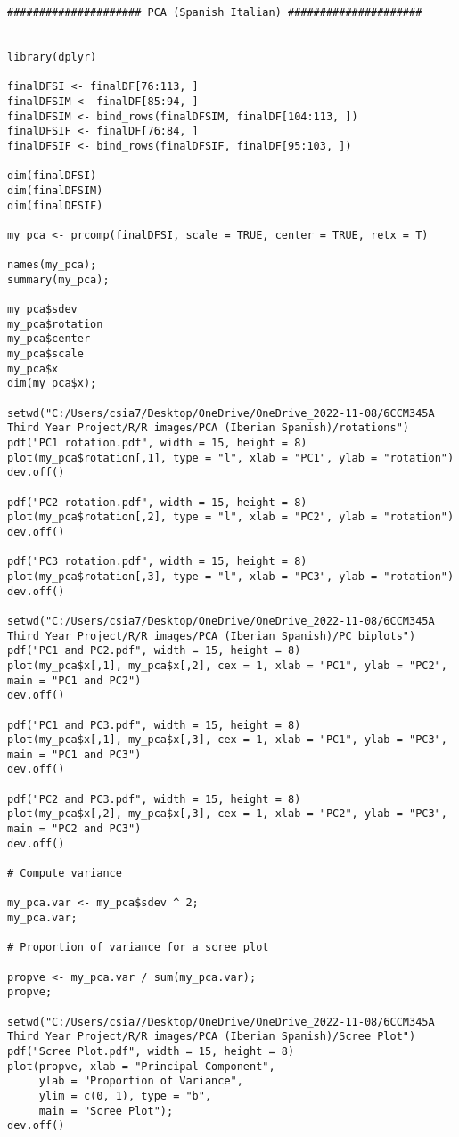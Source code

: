 \begin{verbatim}
##################### PCA (Spanish Italian) #####################


library(dplyr)

finalDFSI <- finalDF[76:113, ]
finalDFSIM <- finalDF[85:94, ]
finalDFSIM <- bind_rows(finalDFSIM, finalDF[104:113, ])
finalDFSIF <- finalDF[76:84, ]
finalDFSIF <- bind_rows(finalDFSIF, finalDF[95:103, ])

dim(finalDFSI)
dim(finalDFSIM)
dim(finalDFSIF)

my_pca <- prcomp(finalDFSI, scale = TRUE, center = TRUE, retx = T)

names(my_pca);
summary(my_pca);

my_pca$sdev
my_pca$rotation
my_pca$center
my_pca$scale
my_pca$x
dim(my_pca$x);

setwd("C:/Users/csia7/Desktop/OneDrive/OneDrive_2022-11-08/6CCM345A Third Year Project/R/R images/PCA (Iberian Spanish)/rotations")
pdf("PC1 rotation.pdf", width = 15, height = 8) 
plot(my_pca$rotation[,1], type = "l", xlab = "PC1", ylab = "rotation")
dev.off()

pdf("PC2 rotation.pdf", width = 15, height = 8) 
plot(my_pca$rotation[,2], type = "l", xlab = "PC2", ylab = "rotation")
dev.off()

pdf("PC3 rotation.pdf", width = 15, height = 8) 
plot(my_pca$rotation[,3], type = "l", xlab = "PC3", ylab = "rotation")
dev.off()

setwd("C:/Users/csia7/Desktop/OneDrive/OneDrive_2022-11-08/6CCM345A Third Year Project/R/R images/PCA (Iberian Spanish)/PC biplots")
pdf("PC1 and PC2.pdf", width = 15, height = 8) 
plot(my_pca$x[,1], my_pca$x[,2], cex = 1, xlab = "PC1", ylab = "PC2", main = "PC1 and PC2")
dev.off()

pdf("PC1 and PC3.pdf", width = 15, height = 8) 
plot(my_pca$x[,1], my_pca$x[,3], cex = 1, xlab = "PC1", ylab = "PC3", main = "PC1 and PC3")
dev.off()

pdf("PC2 and PC3.pdf", width = 15, height = 8) 
plot(my_pca$x[,2], my_pca$x[,3], cex = 1, xlab = "PC2", ylab = "PC3", main = "PC2 and PC3")
dev.off()

# Compute variance

my_pca.var <- my_pca$sdev ^ 2;
my_pca.var;

# Proportion of variance for a scree plot

propve <- my_pca.var / sum(my_pca.var);
propve;

setwd("C:/Users/csia7/Desktop/OneDrive/OneDrive_2022-11-08/6CCM345A Third Year Project/R/R images/PCA (Iberian Spanish)/Scree Plot")
pdf("Scree Plot.pdf", width = 15, height = 8) 
plot(propve, xlab = "Principal Component",
     ylab = "Proportion of Variance",
     ylim = c(0, 1), type = "b",
     main = "Scree Plot");
dev.off()


\end{verbatim}
